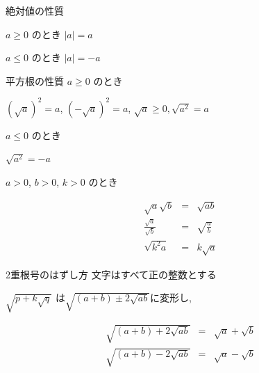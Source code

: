 \documentclass[aspectratio=169, 12pt]{beamer} %
\begin{document}
\begin{frame}{絶対値の性質}
    \begin{center}
        $ a \geq 0 $ のとき $|a|=a$ \par
        $ a \leq 0 $ のとき $|a|=-a$ \par
    \end{center}
\end{frame}
\begin{frame}{平方根の性質}
    $ a \geq 0 $ のとき \par
    \begin{center}
        $(\sqrt{a})^2=a$, $(-\sqrt{a})^2=a$, $\sqrt{a}\geq 0, \sqrt{a^2}=a$
    \end{center}
    $ a \leq 0 $ のとき \par
    \begin{center}
        $\sqrt{a^2}=-a$
    \end{center}
    $ a > 0$, $b>0$, $k>0$ のとき \par
    \begin{eqnarray*}
        \sqrt{a}\sqrt{b}&=&\sqrt{ab} \\
        \frac{\sqrt{a}}{\sqrt{b}}&=&\sqrt{\frac{a}{b}} \\
        \sqrt{k^2a}&=&k\sqrt{a}
    \end{eqnarray*}
\end{frame}
\begin{frame}{2重根号のはずし方}
    文字はすべて正の整数とする \par
    $\sqrt{p+k\sqrt{q}}$ は$\sqrt{(a+b)\pm 2\sqrt{ab}}$に変形し, \par
    \begin{eqnarray*}
        \sqrt{(a+b)+2\sqrt{ab}}&=&\sqrt{a}+\sqrt{b} \\
        \sqrt{(a+b)-2\sqrt{ab}}&=&\sqrt{a}-\sqrt{b}
    \end{eqnarray*}
\end{frame}
\end{document}

